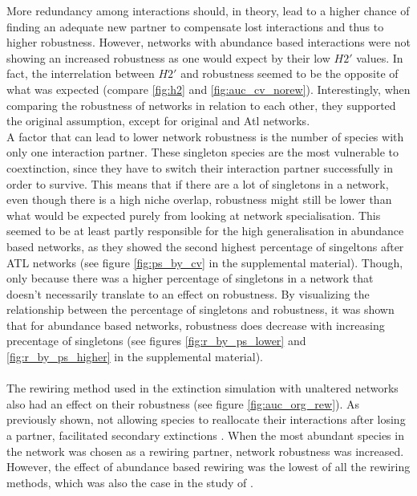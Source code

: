 \documentclass[12pt,a4paper]{article}
\begin{document}
More redundancy among interactions should, in theory, lead to a higher chance of finding an adequate new partner to compensate lost interactions and thus to higher robustness. However, networks with abundance based interactions were not showing an increased robustness as one would expect by their low $H2'$ values. In fact, the interrelation between $H2'$ and robustness seemed to be the opposite of what was expected (compare \ref{fig:h2} and \ref{fig:auc_cv_norew}). Interestingly, when comparing the robustness of networks in relation to each other, they supported the original assumption, except for original and Atl networks.\\ A factor that can lead to lower network robustness is the number of species with only one interaction partner. These singleton species are the most vulnerable to coextinction, since they have to switch their interaction partner successfully in order to survive. This means that if there are a lot of singletons in a network, even though there is a high niche overlap, robustness might still be lower than what would be expected purely from looking at network specialisation. This seemed to be at least partly responsible for the high generalisation in abundance based networks, as they showed the second highest percentage of singeltons after ATL networks (see figure \ref{fig:ps_by_cv} in the supplemental material). Though, only because there was a higher percentage of singletons in a network that doesn't necessarily translate to an effect on robustness. By visualizing the relationship between the percentage of singletons and robustness, it was shown that for abundance based networks, robustness does decrease with increasing precentage of singletons (see figures \ref{fig:r_by_ps_lower} and \ref{fig:r_by_ps_higher} in the supplemental material).\paragraph{}

The rewiring method used in the extinction simulation with unaltered networks also had an effect on their robustness (see figure \ref{fig:auc_org_rew}). As previously shown, not allowing species to reallocate their interactions after losing a partner, facilitated secondary extinctions \parencite{Kaiser-Bunbury2010, Schleuning2016, Timoteo2016, Costa2018}. When the most abundant species in the network was chosen as a rewiring partner, network robustness was increased. However, the effect of abundance based rewiring was the lowest of all the rewiring methods, which was also the case in the study of \parencite{Vizentin-Bugoni2019}. 
\end{document}

